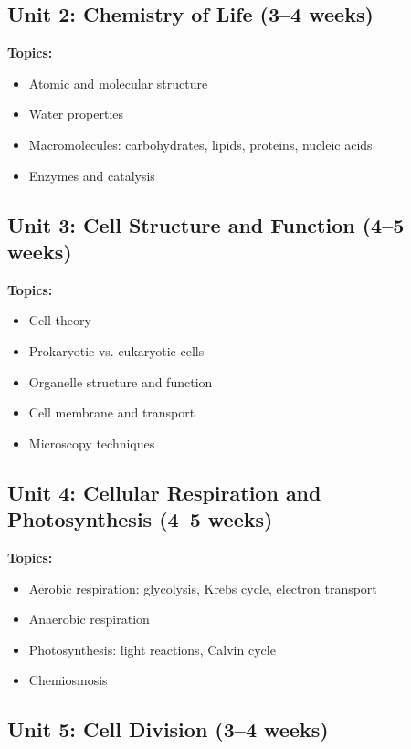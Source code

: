 \documentclass[12pt,oneside]{book}
\begin{document}
\subsection{Unit 2: Chemistry of Life (3--4 weeks)}

\textbf{Topics:}
\begin{itemize}
    \item Atomic and molecular structure
    \item Water properties
    \item Macromolecules: carbohydrates, lipids, proteins, nucleic acids
    \item Enzymes and catalysis
\end{itemize}

\subsection{Unit 3: Cell Structure and Function (4--5 weeks)}

\textbf{Topics:}
\begin{itemize}
    \item Cell theory
    \item Prokaryotic vs. eukaryotic cells
    \item Organelle structure and function
    \item Cell membrane and transport
    \item Microscopy techniques
\end{itemize}

\subsection{Unit 4: Cellular Respiration and Photosynthesis (4--5 weeks)}

\textbf{Topics:}
\begin{itemize}
    \item Aerobic respiration: glycolysis, Krebs cycle, electron transport
    \item Anaerobic respiration
    \item Photosynthesis: light reactions, Calvin cycle
    \item Chemiosmosis
\end{itemize}

\subsection{Unit 5: Cell Division (3--4 weeks)}
\end{document}
